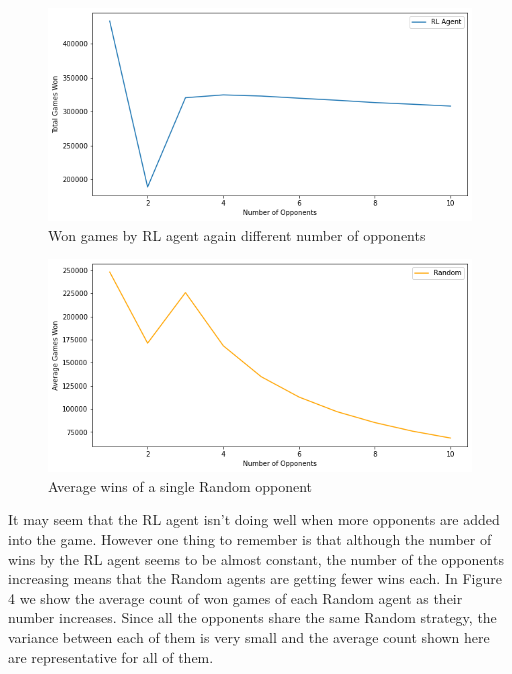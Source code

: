 \documentclass[11pt, oneside]{article}   	%
\begin{document}
\hfill

\begin{figure}[h]
    \centering
    \includegraphics[scale=0.5]{./images/multi_opp_rl.png}
    \caption{Won games by RL agent again different number of opponents}
    \label{fig:mesh1}
\end{figure}

\begin{figure}[h]
    \centering
    \includegraphics[scale=0.5]{./images/multi_opp_random.png}
    \caption{Average wins of a single Random opponent}
    \label{fig:mesh1}
\end{figure}

It may seem that the RL agent isn't doing well when more opponents are added into the game. However one thing to remember is that although the number of wins by the RL agent seems to be almost constant, the number of the opponents increasing means that the Random agents are getting fewer wins each. In Figure 4 we show the average count of won games of each Random agent as their number increases. Since all the opponents share the same Random strategy, the variance between each of them is very small and the average count shown here are representative for all of them.

\hfill
\end{document}
